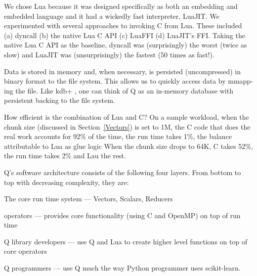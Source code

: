We chose Lua
because it was designed specifically as both an embedding and embedded language
\cite{Lua2011} and it had a wickedly fast interpreter, LuaJIT.
We experimented with several approaches to invoking C from Lua. These included
(a) dyncall \cite{Adler2013} (b) the native Lua C API (c) LuaFFI (d) LuaJIT's
FFI. Taking the native Lua C API as the baseline, dyncall was (surprisingly) the worst (twice
as slow) and LuaJIT was (unsurprisingly) the fastest (50 times as fast!).

Data is stored in memory and, when necessary, is persisted (uncompressed) in
binary format to the file system. This allows us to quickly access data by
mmapp-ing the file.  Like kdb+ \cite{Borror2015}, one can think of Q as 
an in-memory database with persistent backing to the file system.

How efficient is the combination of Lua and C? 
On a sample workload, when the chunk size 
(discussed in Section~\ref{Vectors})
is set to 1M, the C code that does the real work
accounts for 92\% of the time, the run time takes 1\%, the balance attributable to Lua as glue logic 
When the chunk size drops to 64K, C takes 52\%, the run time takes 2\% and Lau
the rest.

Q's software architecture consists of the following four layers. From bottom to
top with decreasing complexity, they are:
\be
\item The core run time system --- Vectors, Scalars, Reducers
\item operators --- provides core functionality (using C and OpenMP) on
  top of run time
\item Q library developers --- use Q and Lua to create higher level functions on
  top of core operators
\item Q programmers --- use Q much the way  Python programmer uses scikit-learn.
  \ee







% 

